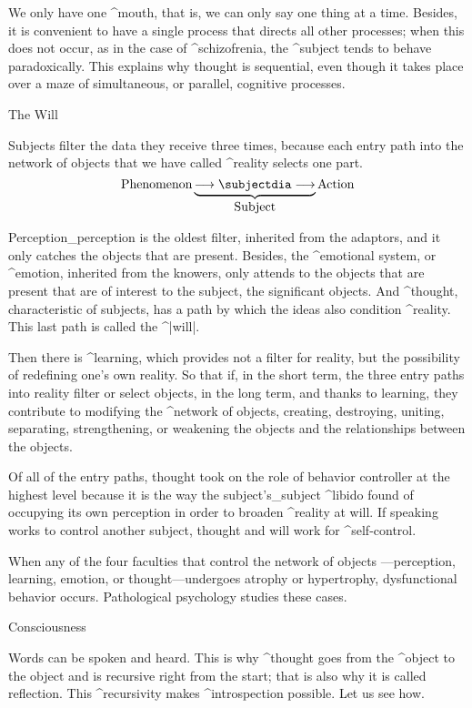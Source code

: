 We only have one ^{mouth}, that is, we can only say one thing at a time.
Besides, it is convenient to have a single process that directs all
other processes; when this does not occur, as in the case of
^{schizofrenia}, the ^{subject} tends to behave paradoxically. This
explains why thought is sequential, even though it takes place over a
maze of simultaneous, or parallel, cognitive processes.


\Section The Will

Subjects filter the data they receive three times, because each entry
path into the network of objects that we have called ^{reality} selects
one part.
$$\hbox{Phenomenon}
  \underbrace{\longrightarrow\subjectdia
   \longrightarrow}_{\hbox{Subject}}
  \hbox{Action}
\abovedisplayskip=\abovedisplayshortskip
\belowdisplayskip=\belowdisplayshortskip
$$

Perception_{perception} is the oldest filter, inherited from the
adaptors, and it only catches the objects that are present. Besides, the
^{emotional system}, or ^{emotion}, inherited from the knowers, only
attends to the objects that are present that are of interest to the
subject, the significant objects. And ^{thought}, characteristic of
subjects, has a path by which the ideas also condition ^{reality}. This
last path is called the ^|will|.

Then there is ^{learning}, which provides not a filter for reality, but
the possibility of redefining one's own reality. So that if, in the
short term, the three entry paths into reality filter or select objects,
in the long term, and thanks to learning, they contribute to modifying
the ^{network of objects}, creating, destroying, uniting, separating,
strengthening, or weakening the objects and the relationships between
the objects.

Of all of the entry paths, thought took on the role of behavior
controller at the highest level because it is the way the
subject's_{subject} ^{libido} found of occupying its own perception in
order to broaden ^{reality} at will. If speaking works to control
another subject, thought and will work for ^{self-control}.

When any of the four faculties that control the network of objects
---perception, learning, emotion, or thought---undergoes atrophy or
hypertrophy, dysfunctional behavior occurs. Pathological psychology
studies these cases.


\Section Consciousness

Words can be spoken and heard. This is why ^{thought} goes from the
^{object} to the object and is recursive right from the start; that is
also why it is called reflection. This ^{recursivity} makes
^{introspection} possible. Let us see how.

